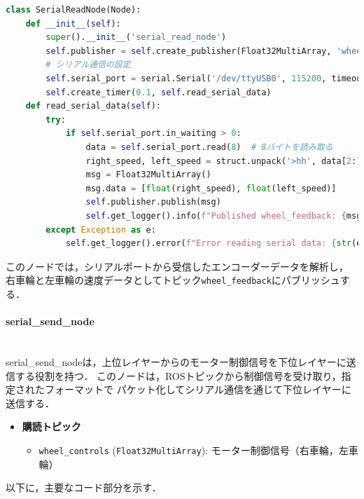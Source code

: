 \begin{lstlisting}[language=Python, caption=シリアルデータの受信とトピックへのパブリッシュ (serial\_read\_node.py)]
class SerialReadNode(Node):
    def __init__(self):
        super().__init__('serial_read_node')
        self.publisher = self.create_publisher(Float32MultiArray, 'wheel_feedback', 10)
        # シリアル通信の設定
        self.serial_port = serial.Serial('/dev/ttyUSB0', 115200, timeout=1)
        self.create_timer(0.1, self.read_serial_data)
    def read_serial_data(self):
        try:
            if self.serial_port.in_waiting > 0:
                data = self.serial_port.read(8)  # 8バイトを読み取る
                right_speed, left_speed = struct.unpack('>hh', data[2:])  # データのデコード
                msg = Float32MultiArray()
                msg.data = [float(right_speed), float(left_speed)]
                self.publisher.publish(msg)
                self.get_logger().info(f"Published wheel_feedback: {msg.data}")
        except Exception as e:
            self.get_logger().error(f"Error reading serial data: {str(e)}")
\end{lstlisting}

このノードでは，シリアルポートから受信したエンコーダーデータを解析し，
右車輪と左車輪の速度データとしてトピック\texttt{wheel\_feedback}にパブリッシュする．

\paragraph{serial\_send\_node}\mbox{}\\
serial\_send\_nodeは，上位レイヤーからのモーター制御信号を下位レイヤーに送信する役割を持つ．
このノードは，ROSトピックから制御信号を受け取り，指定されたフォーマットで
パケット化してシリアル通信を通じて下位レイヤーに送信する．

\begin{itemize}
    \item \textbf{購読トピック}
          \begin{itemize}
              \item \texttt{wheel\_controls} (\texttt{Float32MultiArray}): モーター制御信号（右車輪，左車輪）
          \end{itemize}
\end{itemize}

以下に，主要なコード部分を示す．

